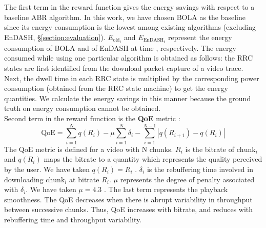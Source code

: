 \indent The first term in the reward function gives the energy savings with respect to a baseline ABR algorithm. In this work, we have chosen BOLA \cite{Spiteri2016} as the baseline since its energy consumption is the lowest among existing algorithms (excluding EnDASH, \S{\ref{section:evaluation}}).  $E_{\mathrm{old}_t}$ and $E_{\mathrm{EnDASH}_t}$ represent the energy consumption of BOLA and of EnDASH at time , respectively. The energy consumed while using one particular algorithm is obtained as follows:  the RRC states are first identified from the download packet capture of a video trace. Next, the dwell time in each RRC state is multiplied by the corresponding power consumption (obtained from the RRC state machine) to get the energy quantities. We calculate the energy savings in this manner because the ground truth on energy consumption cannot be obtained.\\
\indent Second term in the reward function is the \textbf{\ac{QoE}} metric  \cite{Yin2015}:
\begin{equation}\label{eq:QoE}
   \text{QoE} = \sum_{i=1}^N q(R_i) - \mu\sum_{i=1}^N \delta_i - \sum_{i=1}^{N-1}\left|q(R_{i+1})-q(R_i)\right|
\end{equation}
The $\text{QoE}$ metric is defined for a video with N chunks. $R_i$ is the bitrate of $\text{chunk}_i$ and $q(R_i)$ maps the bitrate to a quantity which represents the quality perceived by the user. We have taken $q(R_i) = R_i$ \cite{mao2017neural}. $\delta_i$ is the rebuffering time involved in downloading $\text{chunk}_i$ at bitrate $R_i$. $\mu$ represents the degree of penalty associated with $\delta_i$.  We have taken $\mu=4.3$ \cite{mao2017neural}. The last term represents the playback smoothness. The QoE decreases when there is abrupt variability in throughput between successive chunks. Thus, QoE increases with bitrate, and reduces with rebuffering time and throughput variability.
